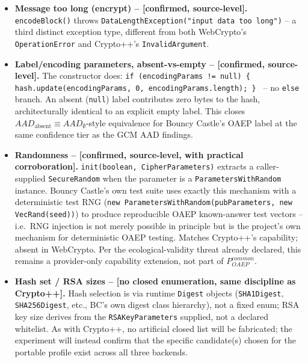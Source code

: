 \documentclass[11pt,a4paper]{article}
\begin{document}
\begin{itemize}
\item \textbf{Message too long (encrypt) -- [confirmed, source-level].} \texttt{encodeBlock()} throws \texttt{DataLengthException("input data too long")} -- a third distinct exception type, different from both WebCrypto's \texttt{OperationError} and Crypto++'s \texttt{InvalidArgument}.
\item \textbf{Label/encoding parameters, absent-vs-empty -- [confirmed, source-level].} The constructor does: \texttt{if (encodingParams != null) \{ hash.update(encodingParams, 0, encodingParams.length); \} } -- no \texttt{else} branch. An absent (\texttt{null}) label contributes zero bytes to the hash, architecturally identical to an explicit empty label. This closes $AAD_{\text{absent}} \equiv AAD_{\emptyset}$-style equivalence for Bouncy Castle's OAEP label at the same confidence tier as the GCM AAD findings.
\item \textbf{Randomness -- [confirmed, source-level, with practical corroboration].} \texttt{init(boolean, CipherParameters)} extracts a caller-supplied \texttt{SecureRandom} when the parameter is a \texttt{ParametersWithRandom} instance. Bouncy Castle's own test suite uses exactly this mechanism with a deterministic test RNG (\texttt{new ParametersWithRandom(pubParameters, new VecRand(seed))}) to produce reproducible OAEP known-answer test vectors -- i.e.\ RNG injection is not merely possible in principle but is the project's own mechanism for deterministic OAEP testing. Matches Crypto++'s capability; absent in WebCrypto. Per the ecological-validity threat already declared, this remains a provider-only capability extension, not part of $P_{OAEP}^{common}$.
\item \textbf{Hash set / RSA sizes -- [no closed enumeration, same discipline as Crypto++].} Hash selection is via runtime \texttt{Digest} objects (\texttt{SHA1Digest}, \texttt{SHA256Digest}, etc., BC's own digest class hierarchy), not a fixed enum; RSA key size derives from the \texttt{RSAKeyParameters} supplied, not a declared whitelist. As with Crypto++, no artificial closed list will be fabricated; the experiment will instead confirm that the specific candidate(s) chosen for the portable profile exist across all three backends.
\end{itemize}
\end{document}
